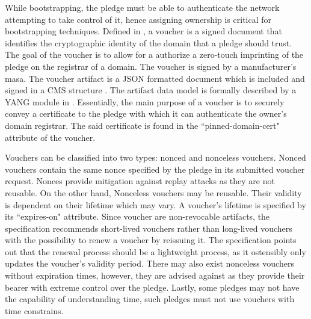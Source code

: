 While bootstrapping, the pledge must be able to authenticate the network attempting to take control of it, hence assigning ownership is critical for bootstrapping techniques. Defined in \cite{rfc8366}, a voucher is a signed document that identifies the cryptographic identity of the domain that a pledge should trust. The goal of the voucher is to allow for a authorize a zero-touch imprinting of the pledge on the registrar of a domain. The voucher is signed by a manufacturer's \gls{masa}. The voucher artifact is a JSON formatted document which is included and signed in a CMS structure \cite{rfc5652}. The artifact data model is formally described by a YANG \cite{rfc7950} module in \cite[Section~5.3]{rfc8366}. Essentially, the main purpose of a voucher is to securely convey a certificate to the pledge with which it can authenticate the owner's domain registrar. The said certificate is found in the ``pinned-domain-cert" attribute of the voucher. 
\par
Vouchers can be classified into two types: nonced and nonceless vouchers. Nonced vouchers contain the same nonce specified by the pledge in its submitted voucher request. Nonces provide mitigation against replay attacks as they are not reusable. On the other hand, Nonceless vouchers may be reusable. Their validity is dependent on their lifetime which may vary. A voucher's lifetime is specified by its ``expires-on" attribute. 
Since voucher are non-revocable artifacts, the specification recommends short-lived vouchers rather than long-lived vouchers with the possibility to renew a voucher by reissuing it. The specification points out that the renewal process should be a lightweight process, as it ostensibly only updates the voucher's validity period. There may also exist nonceless vouchers without expiration times, however, they are advised against as they provide their bearer with extreme control over the pledge. Lastly, some pledges may not have the capability of understanding time, such pledges must not use vouchers with time constrains.
